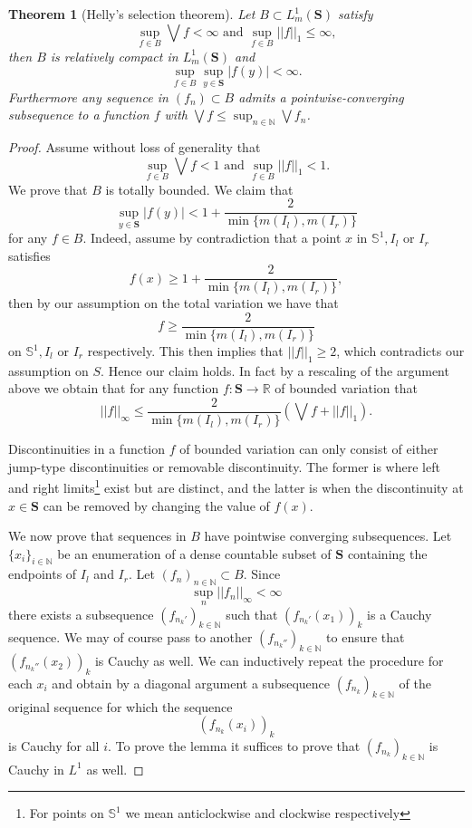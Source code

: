 \documentclass[pdftex,11pt,a4paper,oneside]{article}
\theoremstyle{plain}
\newtheorem{theorem}{Theorem}[section]
\begin{document}
\begin{theorem}[Helly's selection theorem]\label{theorem:CompactnessOfEmbedding}
Let $B\subset L^1_m(\mathbf{S})$ satisfy 
\[\sup_{f\in B} \bigvee f <\infty\text{ and } \sup_{f\in B} ||f||_1 \leq \infty,\]
then $B$ is relatively compact in $L^1_m(\mathbf{S})$ and \[\sup_{f\in B}\sup_{y\in\mathbf{S}}|f(y)|< \infty.\] Furthermore any sequence in $(f_n) \subset B$ admits a pointwise-converging subsequence to a function $f$ with $\bigvee f \leq \sup_{n\in\mathbb{N}} \bigvee f_n$.
\end{theorem}
\begin{proof}
Assume without loss of generality that 
\[\sup_{f\in B} \bigvee f<1\text{ and }\sup_{f\in B} ||f||_1 <1.\] 
We prove that $B$ is totally bounded. We claim that \[\sup_{y\in\mathbf{S}}|f(y)| < 1+ \frac{2}{\min\{m(I_l),m(I_r)\}}\] 
for any $f\in B$. Indeed, assume by contradiction that a point $x$ in $\mathbb{S}^1, I_l$ or $I_r$ satisfies \[f(x)\geq 1+ \frac{2}{\min\{m(I_l),m(I_r)\}} ,\] then by our assumption on the total variation we have that \[f\geq \frac{2}{\min\{m(I_l),m(I_r)\}}\] on $\mathbb{S}^1, I_l$ or $I_r$ respectively. This then implies that $||f||_1\geq 2$, which contradicts our assumption on $S$. Hence our claim holds. In fact by a rescaling of the argument above we obtain that for any function $f:\mathbf{S}\to\mathbb{R}$ of bounded variation that 
\[||f||_\infty \leq\frac{2}{\min\{m(I_l),m(I_r)\}}\left(\bigvee f + ||f||_1\right).\]

Discontinuities in a function $f$ of bounded variation can only consist of either jump-type discontinuities or removable discontinuity. The former is where left and right limits\footnote{For points on $\mathbb{S}^1$ we mean anticlockwise and clockwise respectively} exist but are distinct, and the latter is when the discontinuity at $x\in\mathbf{S}$ can be removed by changing the value of $f(x)$. %

We now prove that sequences in $B$ have pointwise converging subsequences. Let $\{x_i\}_{i\in\mathbb{N}}$ be an enumeration of a dense countable subset of $\mathbf{S}$ containing the endpoints of $I_l$ and $I_r$. Let $(f_n)_{n\in\mathbb{N}}\subset B$. Since \[\sup_n ||f_n||_\infty<\infty\] there exists a subsequence $(f_{n_k'})_{k\in\mathbb{N}}$ such that $(f_{n_k'}(x_1))_{k}$ is a Cauchy sequence. We may of course pass to another $(f_{n_k''})_{k\in\mathbb{N}}$ to ensure that $(f_{n_k''}(x_2))_{k}$ is Cauchy as well. We can inductively repeat the procedure for each $x_i$ and obtain by a diagonal argument a subsequence $(f_{n_k})_{k\in\mathbb{N}}$ of the original sequence for which the sequence 
\[(f_{n_k}(x_i))_k \]
is Cauchy for all $i$. To prove the lemma it suffices to prove that $(f_{n_k})_{k\in\mathbb{N}}$ is Cauchy in $L^1$ as well.


\end{proof}
\end{document}
